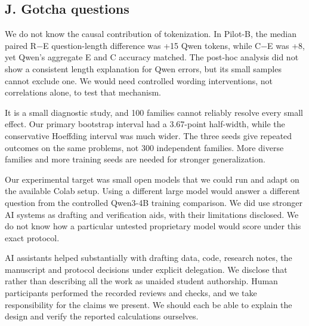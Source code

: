 \subsection*{J. Gotcha questions}


\medskip{}\par\nopagebreak

We do not know the causal contribution of tokenization. In Pilot-B, the median paired R−E question-length difference was +15 Qwen tokens, while C−E was +8, yet Qwen's aggregate E and C accuracy matched. The post-hoc analysis did not show a consistent length explanation for Qwen errors, but its small samples cannot exclude one. We would need controlled wording interventions, not correlations alone, to test that mechanism.

\medskip{}\par\nopagebreak

It is a small diagnostic study, and 100 families cannot reliably resolve every small effect. Our primary bootstrap interval had a 3.67-point half-width, while the conservative Hoeffding interval was much wider. The three seeds give repeated outcomes on the same problems, not 300 independent families. More diverse families and more training seeds are needed for stronger generalization.

\medskip{}\par\nopagebreak

Our experimental target was small open models that we could run and adapt on the available Colab setup. Using a different large model would answer a different question from the controlled Qwen3-4B training comparison. We did use stronger AI systems as drafting and verification aids, with their limitations disclosed. We do not know how a particular untested proprietary model would score under this exact protocol.

\medskip{}\par\nopagebreak

AI assistants helped substantially with drafting data, code, research notes, the manuscript and protocol decisions under explicit delegation. We disclose that rather than describing all the work as unaided student authorship. Human participants performed the recorded reviews and checks, and we take responsibility for the claims we present. We should each be able to explain the design and verify the reported calculations ourselves.

